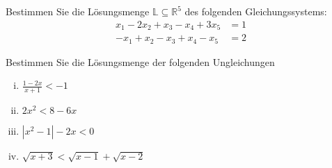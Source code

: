 \documentclass[11pt]{article}
\begin{document}
\begin{task}
	Bestimmen Sie die Lösungsmenge $\mathbb{L}\subseteq \mathbb{R}^5$ des folgenden Gleichungssystems:
	\begin{align*}
		x_1-2x_2+x_3-x_4+3x_5&=1\\
		-x_1+x_2-x_3+x_4-x_5&=2	
\end{align*}	
\end{task}
\begin{task}
	Bestimmen Sie die Lösungsmenge der folgenden Ungleichungen
	\begin{enumerate}[i)]
		\item $\frac{1-2x}{x+1}<-1$
		\item $2x^2 <8−6x$
		\item $|x^2-1|-2x<0$
		\item $\sqrt{x+3}<\sqrt{x-1}+\sqrt{x-2}$
	\end{enumerate}
\end{task}




\end{document}

